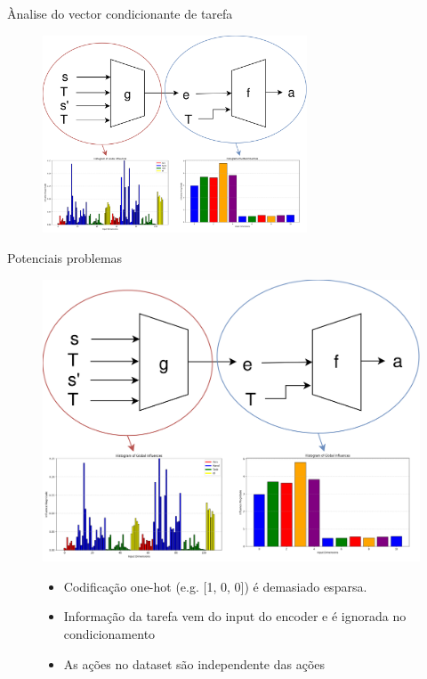 \begin{frame}{Ànalise do vector condicionante de tarefa}
    \begin{figure}
        \centering
        \vspace{0pt}
        \includegraphics[width=0.7\textwidth]{img/sacaar_ig.png}
    \end{figure}
\end{frame}
\begin{frame}{Potenciais problemas}
    \begin{figure}
        \begin{minipage}[t]{0.4\linewidth}
            \centering
            \vspace{0pt}
            \includegraphics[width=\textwidth]{img/sacaar_ig.png}
        \end{minipage}
        \hspace{0.5cm}
        \begin{minipage}[t]{0.4\linewidth}
            \begin{itemize}
                \item Codificação one-hot (e.g. [1, 0, 0]) é demasiado esparsa.
                \item Informação da tarefa vem do input do encoder e é ignorada no condicionamento
                \item As ações no dataset são independente das ações
            \end{itemize}
        \end{minipage}
    \end{figure}
\end{frame}
